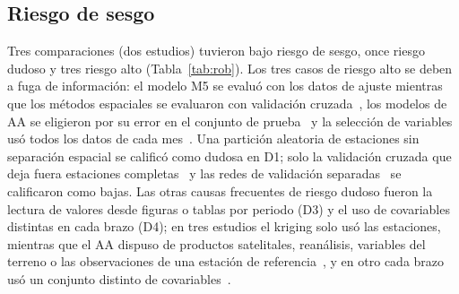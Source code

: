 \documentclass[conference]{IEEEtran}
\begin{document}
\subsection{Riesgo de sesgo}
Tres comparaciones (dos estudios) tuvieron bajo riesgo de sesgo, once riesgo dudoso y tres riesgo alto (Tabla~\ref{tab:rob}). Los tres casos de riesgo alto se deben a fuga de información: el modelo M5 se evaluó con los datos de ajuste mientras que los métodos espaciales se evaluaron con validación cruzada~\cite{ghorbani2025}, los modelos de AA se eligieron por su error en el conjunto de prueba~\cite{husrevoglu2025} y la selección de variables usó todos los datos de cada mes~\cite{orellana2021}. Una partición aleatoria de estaciones sin separación espacial se calificó como dudosa en D1; solo la validación cruzada que deja fuera estaciones completas~\cite{sekulic2020} y las redes de validación separadas~\cite{arganaraz2025,he2025,li2026} se calificaron como bajas. Las otras causas frecuentes de riesgo dudoso fueron la lectura de valores desde figuras o tablas por periodo (D3) y el uso de covariables distintas en cada brazo (D4); en tres estudios el kriging solo usó las estaciones, mientras que el AA dispuso de productos satelitales, reanálisis, variables del terreno o las observaciones de una estación de referencia~\cite{chen2021,he2025,li2026}, y en otro cada brazo usó un conjunto distinto de covariables~\cite{husrevoglu2025}.
\end{document}
